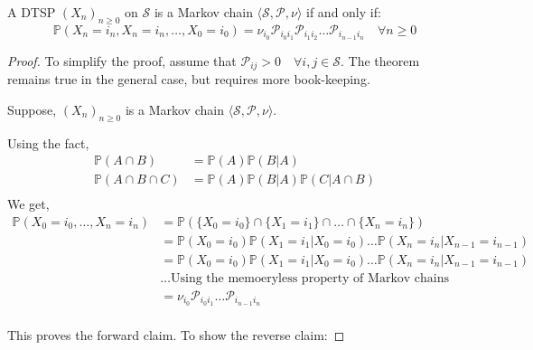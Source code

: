 \begin{theorem}
    A DTSP \({(X_n)}_{n \geq 0}\) on \(\mathcal{S}\)  is a Markov chain \(\langle \mathcal{S} , \mathcal{P} 
    ,\nu \rangle\) if and only if:
    \[
        \mathbb{P} \left( 
            X_{n} = i_{n} , X_{n} = i_{n}, \dots, X_{0} = i_{0}
            \right) = \nu _{i_{0}} \mathcal{P} _{i_{0} i_{1}}
             \mathcal{P} _{i_{1} i_{2}} \dots \mathcal{P} _{i_{n-1} i_{n}} \quad \forall n \geq 0
    \] 
\end{theorem}
\begin{proof}
    To simplify the proof, assume that \(\mathcal{P}_{ij} > 0 \quad \forall i, j \in \mathcal{S} \).
    The theorem remains true in the general case, but requires more book-keeping.

    Suppose, \({(X_n)}_{n \geq 0}\) is a Markov chain \(\langle \mathcal{S} , \mathcal{P}
    , \nu \rangle\). 
    
    Using the fact,
    \[
        \begin{aligned}
            \mathbb{P}(A \cap B) &= \mathbb{P}(A) \mathbb{P}(B | A) \\
            \mathbb{P}(A \cap B \cap C) &= \mathbb{P}(A) \mathbb{P}(B | A) \mathbb{P}(C | A \cap B) \\
        \end{aligned}
    \]
    We get,
    \[
        \begin{aligned}
            \mathbb{P}(X_0 = i_0, \dots , X_n = i_n)  & = \mathbb{P} \left( 
                \{X_0 = i_0\} \cap \{X_1 = i_1\} \cap \dots \cap \{X_n = i_n\}
             \right)\\ 
             & = \mathbb{P}(X_0 = i_0) \mathbb{P}(X_1 = i_1 | X_0 = i_0) \dots \mathbb{P}(X_n = i_n | X_{n-1} = i_{n-1}) \\
             & = \mathbb{P} (X_0 = i_0) \mathbb{P}(X_1 = i_1 | X_0 = i_0) \dots \mathbb{P}(X_n = i_n | X_{n-1} = i_{n-1}) \\
             &\dots  \text{Using the memoeryless property of Markov chains} \\
                & = \nu _{i_0} \mathcal{P} _{i_0 i_1} \dots \mathcal{P} _{i_{n-1} i_n} \\
        \end{aligned}
    \]

    This proves the forward claim. To show the reverse claim:


\end{proof}
